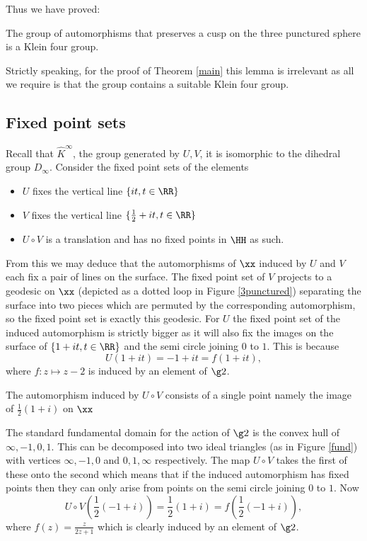 Thus we have proved:

\begin{lem}
The group of automorphisms that preserves a cusp 
on the three punctured sphere is a Klein four group.
\end{lem}

Strictly speaking, for the proof of Theorem \ref{main} this lemma is irrelevant 
as all we require is that the group contains a suitable Klein four group.


\subsection{Fixed point sets }

Recall that  $\hat{K}^\infty$,  the group generated by $U,V$,
it is isomorphic to the dihedral group $D_\infty$.
Consider the fixed point sets of the elements
\begin{itemize}
\item $U$ fixes the  vertical line $\{ it, t \in \RR \} $
\item $V$ fixes the vertical line $\{ \frac{1}{2} +  it , t \in \RR \} $
\item $U\circ V$  is a translation and has no fixed points in $\HH$ as such.
\end{itemize}
From this we may deduce that the automorphisms of $\xx$ induced by $U$ and $V$ 
each fix a pair of lines on the surface. 
The fixed point set of  $V$ projects 
to a geodesic on $\xx$ (depicted as a dotted loop in Figure \ref{3punctured})
separating the surface
 into  two pieces which are permuted by 
the corresponding automorphism,
so the fixed point set is exactly this geodesic.
For $U$ the fixed point set of the induced automorphism  is strictly bigger 
as it will also fix  the images on the surface of 
$\{1+  it, t \in \RR \} $ and the semi circle joining $0$ to $1$.
This is because 
$$U(1+  it) = - 1+  it = f(1+  it),$$
where $f: z \mapsto z - 2$ is induced by an element of $\g2$.


\begin{lem}
The automorphism induced by $U\circ V$ consists of a single point
namely the image of $\frac{1}{2 }(1+ i)$ on $\xx$
\end{lem}

\proof The standard  fundamental domain for the action of $\g2$ 
is the convex hull of $\infty, -1, 0 , 1$.
This can be decomposed into two ideal triangles (as in Figure \ref{fund})
with vertices $\infty, -1, 0 $ and $ 0 , 1,\infty$ respectively.
The map  $U\circ V$ takes the first of these onto the second
which means that
if the induced automorphism has fixed points then 
they can only arise from points on the semi circle joining $0$ to $1$.
Now
$$U\circ V \left(\frac{1}{2 }(-1+ i) \right)  = \frac{1}{2 }(1+ i) = f \left(\frac{1}{2 }(-1+ i) \right),$$
where $f(z) = \frac{z}{2z + 1}$ which  is clearly induced by an element of $\g2$.

